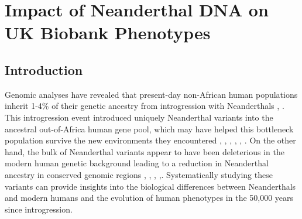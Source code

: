 \chapter{Impact of Neanderthal DNA on UK Biobank Phenotypes}
\section{Introduction}
Genomic analyses have revealed that present-day non-African human populations inherit 1-4\% of their genetic ancestry from introgression with Neanderthals \cite{green2010}, \cite{prfer2014complete}. This introgression event introduced uniquely Neanderthal variants into the ancestral out-of-Africa human gene pool, which may have helped this bottleneck population survive the new environments they encountered \cite{mendez2012at}, \cite{abi-rached2011shaping}, \cite{sankararaman2014genomic}, \cite{vernot2014resurrecting}, \cite{racimo2015evidence}, \cite{gittelman2016archaic}. On the other hand, the bulk of Neanderthal variants appear to have been deleterious in the modern human genetic background leading to a reduction in Neanderthal ancestry in conserved genomic regions \cite{sankararaman2014genomic}, \cite{vernot2014resurrecting}, \cite{harris2016genetic}, \cite{juric2016strength},\cite{petr2019limits}. Systematically studying these variants can provide insights into the biological differences between Neanderthals and modern humans and the evolution of human phenotypes in the 50,000 years since introgression. 

